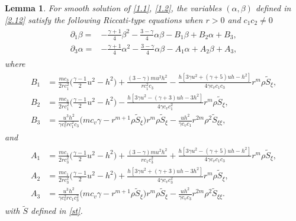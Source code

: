 \documentclass[10pt,a4paper]{amsart}
\newtheorem{lem}{Lemma}
\newcommand{\fr}{\frac}
\newcommand{\pa}{\partial}
\begin{document}
\begin{lem}\label{lem1}
For smooth solution of \eqref{1.1}, \eqref{1.2}, the variables $(\alpha, \beta)$ defined in \eqref{2.12} satisfy the following Riccati-type equations when $r>0$ and $c_1c_2\neq 0$
\begin{align}\label{3.1}
\begin{split}
\pa_1 \beta =& -\frac{\gamma+1}{4} \beta^{2}
  -\frac{3-\gamma}{4} \alpha \beta-B_{1}\beta+ B_{2} \alpha +B_3, \\[4pt]
\pa_3 \alpha =& -\frac{\gamma+1}{4} \alpha^{2}
  -\frac{3-\gamma}{4} \alpha \beta-A_{1}\alpha+ A_{2} \beta +A_3,
\end{split}
\end{align}
where
\begin{align}\label{3.2}
\begin{split}
B_{1} &=\fr{mc_3}{2rc_{1}^2}\Big(\fr{\gamma-1}{2}u^2-h^2\Big) +\fr{(3-\gamma)mu^2h^2}{rc_{1}^2c_3} -\fr{h[3\gamma u^2+(\gamma+5)uh-h^2]}{4\gamma c_v c_1c_3}r^m\rho \widetilde{S}_\xi,   \\
B_{2} &=\fr{mc_3}{2rc_{1}^2}\Big(\fr{\gamma-1}{2}u^2-h^2\Big) -\fr{h[3\gamma u^2-(\gamma+3)uh-3h^2]}{4\gamma c_v c_{1}^2}r^m\rho \widetilde{S}_\xi,    \\
B_{3} &=\fr{u^3h^2}{\gamma c_{v}^2 r c_{1}^2 c_{3}}\Big(mc_v\gamma -r^{m+1}\rho \widetilde{S}_\xi\Big) r^m\rho \widetilde{S}_\xi -\fr{uh^2}{\gamma c_v c_1}r^{2m}\rho^2\widetilde{S}_{\xi\xi},
\end{split}
\end{align}
and
\begin{align}\label{3.3}
\begin{split}
A_{1} &=\fr{mc_1}{2rc_{3}^2}\Big(\fr{\gamma-1}{2}u^2-h^2\Big) +\fr{(3-\gamma)mu^2h^2}{rc_{1}c_{3}^2} +\fr{h[3\gamma u^2-(\gamma+5)uh-h^2]}{4\gamma c_v c_1c_3}r^m\rho \widetilde{S}_\xi,   \\
A_{2} &=\fr{mc_1}{2rc_{3}^2}\Big(\fr{\gamma-1}{2}u^2-h^2\Big) +\fr{h[3\gamma u^2+(\gamma+3)uh-3h^2]}{4\gamma c_v c_{3}^2}r^m\rho \widetilde{S}_\xi,    \\
A_{3} &=\fr{u^3h^2}{\gamma c_{v}^2 rc_{1}c_{3}^2}\Big(mc_v\gamma -r^{m+1}\rho \widetilde{S}_\xi\Big) r^m\rho \widetilde{S}_\xi -\fr{uh^2}{\gamma c_v c_3}r^{2m}\rho^2\widetilde{S}_{\xi\xi}.
\end{split}
\end{align}
with $\widetilde{S}$ defined in \eqref{st}.
\end{lem}
\end{document}
